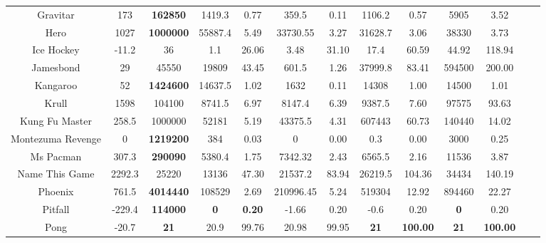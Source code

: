 \documentclass[nohyperref]{article}
\newcommand{\best}[1]{\textbf{#1}}
\theoremstyle{plain}
\begin{document}
\begin{table}[!hb]
\begin{center}
\begin{tabular}{ |c |c |c| c c| c c|  c c |c c |c c |}
 Gravitar           & 173       & \textbf{162850}    & 1419.3   &0.77    & 359.5      & 0.11       & 1106.2  & 0.57      &5905       &3.52                  \\
 Hero               & 1027      & \textbf{1000000}            & 55887.4  &5.49    & 33730.55   & 3.27       & 31628.7 & 3.06      &38330             &3.73           \\
 Ice Hockey         & -11.2     & 36                 & 1.1      &26.06   & 3.48       & 31.10      & 17.4    & 60.59     &44.92              &118.94      \\
 Jamesbond          & 29        & 45550              & 19809    &43.45   & 601.5      & 1.26       & 37999.8 & 83.41     &594500              &200.00 \\
 Kangaroo           & 52        & \textbf{1424600}   & 14637.5  &1.02    & 1632       & 0.11       & 14308   & 1.00      &14500             &1.01         \\
 Krull              & 1598      & 104100    & 8741.5   &6.97    & 8147.4     & 6.39       & 9387.5  & 7.60      &97575     &93.63                  \\
 Kung Fu Master     & 258.5     & 1000000   & 52181    &5.19    & 43375.5    & 4.31       & 607443  & 60.73     &140440            &14.02          \\
 Montezuma Revenge  &0          & \textbf{1219200}   & 384      &0.03    & 0          & 0.00       & 0.3     & 0.00      &3000              &0.25           \\
 Ms Pacman          & 307.3     & \textbf{290090}    & 5380.4   &1.75    & 7342.32    & 2.43       & 6565.5  & 2.16      &11536              &3.87          \\
 Name This Game     & 2292.3    & 25220              & 13136    &47.30   & 21537.2    & 83.94      & 26219.5 & 104.36    &34434      &140.19 \\
 Phoenix            & 761.5     & \textbf{4014440}   & 108529   &2.69    & 210996.45  & 5.24       & 519304  & 12.92     &894460         &22.27             \\
 Pitfall            & -229.4    & \textbf{114000}    & \textbf{0}        &\textbf{0.20}    & -1.66      & 0.20       & -0.6    & 0.20      &\best{0    }      &0.20          \\
 Pong               & -20.7     & \textbf{21}                 & 20.9     &99.76   & 20.98      & 99.95      & \textbf{21}      & \textbf{100.00}    &\best{21   }      &\best{100.00 }     \\

\end{tabular}
\end{center}
\end{table}
\end{document}
